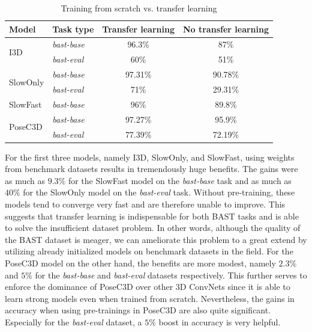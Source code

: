 \documentclass[extern,palatino]{cgMA}
\begin{document}
\begin{table}[h!]
  \begin{center}
    \caption{Training from scratch vs. transfer learning}
    \label{tab:research_question_4_1}
    \begin{tabular}{l|l|c|c|}
      \textbf{Model} & \textbf{Task type} & \textbf{Transfer learning} & \textbf{No transfer learning}\\
      \hline
      \multirow{2}{*}{I3D} & \textit{bast-base} & 96.3\% & 87\% \\
        & \textit{bast-eval} & 60\% & 51\%\\
       \hline
       \multirow{2}{*}{SlowOnly} & \textit{bast-base} & 97.31\% & 90.78\% \\
        & \textit{bast-eval} & 71\% & 29.31\%\\
        \hline
        \multirow{1}{*}{SlowFast} & \textit{bast-base} & 96\% & 89.8\% \\
       \hline
       \multirow{2}{*}{PoseC3D} & \textit{bast-base} & 97.27\% &  95.9\%\\
        & \textit{bast-eval} & 77.39\% &  72.19\%\\
       \hline
    \end{tabular}
  \end{center}
\end{table}

\bigskip
\noindent For the first three models, namely I3D, SlowOnly, and SlowFast, using weights from benchmark datasets results in tremendously huge benefits. The gains were as much as $9.3\%$ for the SlowFast model on the \textit{bast-base} task and as much as $40\%$ for the SlowOnly model on the \textit{bast-eval} task. Without pre-training, these models tend to converge very fast and are therefore unable to improve. This suggests that transfer learning is indispensable for both BAST tasks and is able to solve the insufficient dataset problem. In other words, although the quality of the BAST dataset is meager, we can ameliorate this problem to a great extend by utilizing already initialized models on benchmark datasets in the field. For the PoseC3D model on the other hand, the benefits are more modest, namely $2.3\%$ and $5\%$ for the \textit{bast-base} and \textit{bast-eval} datasets respectively. This further serves to enforce the dominance of PoseC3D over other 3D ConvNets since it is able to learn strong models even when trained from scratch. Nevertheless, the gains in accuracy when using pre-trainings in PoseC3D are also quite significant. Especially for the \textit{bast-eval} dataset, a $5\%$ boost in accuracy is very helpful.
\end{document}

